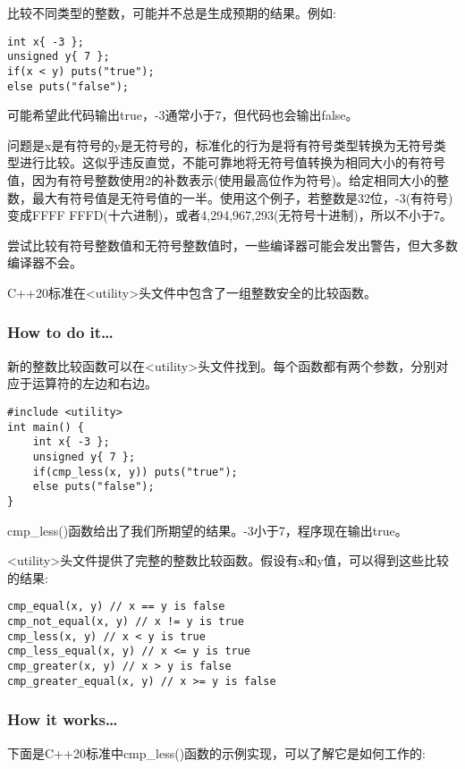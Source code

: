 
比较不同类型的整数，可能并不总是生成预期的结果。例如:

\begin{lstlisting}[style=styleCXX]
int x{ -3 };
unsigned y{ 7 };
if(x < y) puts("true");
else puts("false");
\end{lstlisting}

可能希望此代码输出true，-3通常小于7，但代码也会输出false。

问题是x是有符号的y是无符号的，标准化的行为是将有符号类型转换为无符号类型进行比较。这似乎违反直觉，不能可靠地将无符号值转换为相同大小的有符号值，因为有符号整数使用2的补数表示(使用最高位作为符号)。给定相同大小的整数，最大有符号值是无符号值的一半。使用这个例子，若整数是32位，-3(有符号)变成FFFF FFFD(十六进制)，或者4,294,967,293(无符号十进制)，所以不小于7。

尝试比较有符号整数值和无符号整数值时，一些编译器可能会发出警告，但大多数编译器不会。

C++20标准在<utility>头文件中包含了一组整数安全的比较函数。

\subsubsection{How to do it…}

新的整数比较函数可以在<utility>头文件找到。每个函数都有两个参数，分别对应于运算符的左边和右边。

\begin{lstlisting}[style=styleCXX]
#include <utility>
int main() {
	int x{ -3 };
	unsigned y{ 7 };
	if(cmp_less(x, y)) puts("true");
	else puts("false");
}
\end{lstlisting}

cmp\_less()函数给出了我们所期望的结果。-3小于7，程序现在输出true。

<utility>头文件提供了完整的整数比较函数。假设有x和y值，可以得到这些比较的结果:

\begin{lstlisting}[style=styleCXX]
cmp_equal(x, y) // x == y is false
cmp_not_equal(x, y) // x != y is true
cmp_less(x, y) // x < y is true
cmp_less_equal(x, y) // x <= y is true
cmp_greater(x, y) // x > y is false
cmp_greater_equal(x, y) // x >= y is false
\end{lstlisting}

\subsubsection{How it works…}

下面是C++20标准中cmp\_less()函数的示例实现，可以了解它是如何工作的:

